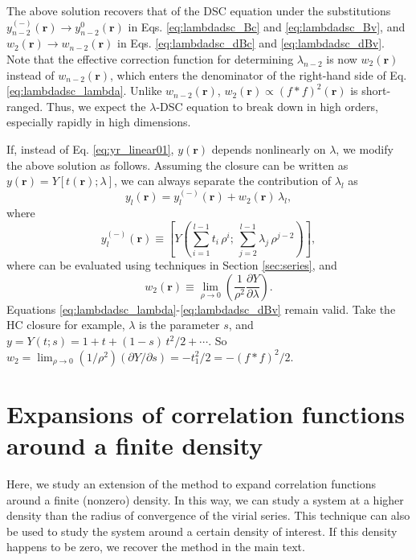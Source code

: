 \documentclass[aip,jcp,preprint,superscriptaddress,showpacs,preprintnumbers,amsmath,amssymb]{revtex4-1}
\numberwithin{equation}{section}
\newcommand{\vct}[1]{\mathbf{#1}}
\providecommand{\vr}{} %
\renewcommand{\vr}{\vct{r}}
\begin{document}
The above solution recovers that of the DSC equation
under the substitutions
$y_{n-2}^{(-)}(\vr) \rightarrow y_{n-2}^0(\vr)$
in Eqs. \eqref{eq:lambdadsc_Bc} and \eqref{eq:lambdadsc_Bv},
and
$w_2(\vr) \rightarrow w_{n-2}(\vr)$
in Eqs. \eqref{eq:lambdadsc_dBc} and \eqref{eq:lambdadsc_dBv}.
%
Note that the effective correction function
for determining $\lambda_{n-2}$ is now $w_2(\vr)$
instead of $w_{n-2}(\vr)$,
which enters the denominator of
the right-hand side of Eq. \eqref{eq:lambdadsc_lambda}.
%
Unlike $w_{n-2}(\vr)$,
$w_2(\vr) \propto (f*f)^2(\vr)$ is short-ranged.
%
Thus,
we expect the $\lambda$-DSC equation
to break down in high orders,
especially rapidly in high dimensions.

If, instead of Eq. \eqref{eq:yr_linear01},
$y(\vr)$ depends nonlinearly on $\lambda$,
we modify the above solution as follows.
%
Assuming the closure can be written as
$y(\vr) = Y[t(\vr); \lambda]$,
we can always separate the contribution of $\lambda_l$ as
%
\begin{equation}
y_l(\vr)
=
y_l^{(-)}(\vr)
+
w_2(\vr) \, \lambda_l,
\end{equation}
%
where
%
\begin{equation}
y_l^{(-)}(\vr)
\equiv
\left[
  Y\left(
    \sum_{i=1}^{l-1} t_i \, \rho^i; \,
    \sum_{j=2}^{l-1} \lambda_j \, \rho^{j-2}
  \right)
\right],
\end{equation}
%
where can be evaluated using techniques
in Section \ref{sec:series}, and
%
\[
w_2(\vr) \equiv
\lim_{\rho \rightarrow 0}
\left(
  \frac{ 1 } { \rho^2 }
  \frac{ \partial Y } { \partial \lambda }
\right).
\]
%
Equations \eqref{eq:lambdadsc_lambda}-\eqref{eq:lambdadsc_dBv}
remain valid.
%
Take the HC closure\cite{
hutchinson1971, *hutchinson1972}
for example,
$\lambda$ is the parameter $s$,
and
$y = Y(t; s) = 1 + t + (1-s)\,t^2/2 + \cdots$.
%
So
$w_2 =
\lim_{\rho \rightarrow 0}
(1/\rho^2)(\partial Y/\partial s)
= - t_1^2 / 2 = -(f*f)^2/2$.





\section{\label{eq:dcorr}
Expansions of correlation functions around a finite density}





Here, we study an extension of the method
to expand correlation functions
around a finite (nonzero) density.
%
In this way,
we can study a system at a higher density than
the radius of convergence of the virial series.
%
This technique can also be used to study the system
around a certain density of interest.
%
If this density happens to be zero,
we recover the method in the main text.
\end{document}
